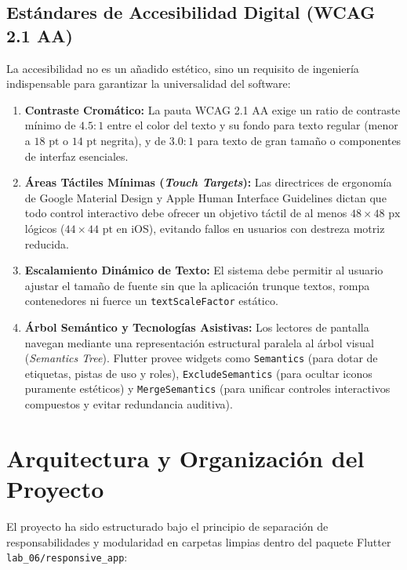 \documentclass[12pt,a4paper]{article}
\begin{document}
\subsection{Estándares de Accesibilidad Digital (WCAG 2.1 AA)}
La accesibilidad no es un añadido estético, sino un requisito de ingeniería indispensable para garantizar la universalidad del software:
\begin{enumerate}[leftmargin=*]
    \item \textbf{Contraste Cromático:} La pauta WCAG 2.1 AA exige un ratio de contraste mínimo de $4.5:1$ entre el color del texto y su fondo para texto regular (menor a $18\text{ pt}$ o $14\text{ pt}$ negrita), y de $3.0:1$ para texto de gran tamaño o componentes de interfaz esenciales.
    \item \textbf{Áreas Táctiles Mínimas (\textit{Touch Targets}):} Las directrices de ergonomía de Google Material Design y Apple Human Interface Guidelines dictan que todo control interactivo debe ofrecer un objetivo táctil de al menos $48\times 48\text{ px}$ lógicos ($44\times 44\text{ pt}$ en iOS), evitando fallos en usuarios con destreza motriz reducida.
    \item \textbf{Escalamiento Dinámico de Texto:} El sistema debe permitir al usuario ajustar el tamaño de fuente sin que la aplicación trunque textos, rompa contenedores ni fuerce un \texttt{textScaleFactor} estático.
    \item \textbf{Árbol Semántico y Tecnologías Asistivas:} Los lectores de pantalla navegan mediante una representación estructural paralela al árbol visual (\textit{Semantics Tree}). Flutter provee widgets como \texttt{Semantics} (para dotar de etiquetas, pistas de uso y roles), \texttt{ExcludeSemantics} (para ocultar iconos puramente estéticos) y \texttt{MergeSemantics} (para unificar controles interactivos compuestos y evitar redundancia auditiva).
\end{enumerate}

\section{Arquitectura y Organización del Proyecto}

El proyecto ha sido estructurado bajo el principio de separación de responsabilidades y modularidad en carpetas limpias dentro del paquete Flutter \texttt{lab\_06/responsive\_app}:
\end{document}
